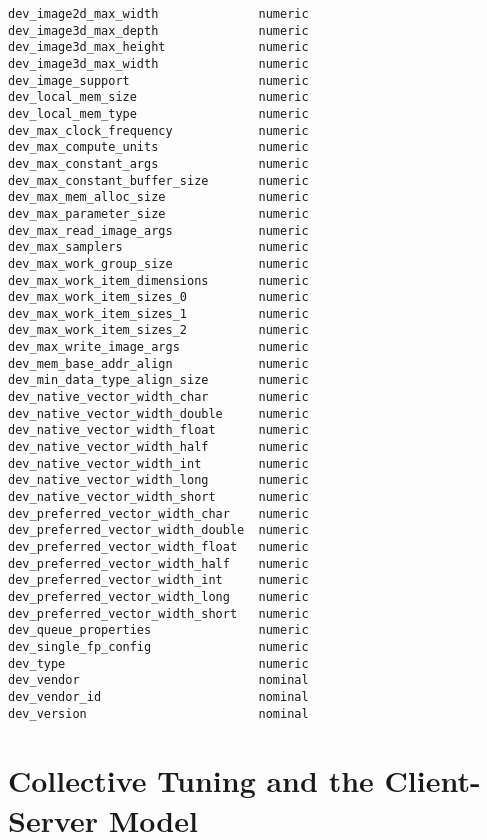 \begin{multicols}{2}
\begin{Verbatim}[fontsize=\footnotesize]
dev_image2d_max_width              numeric
dev_image3d_max_depth              numeric
dev_image3d_max_height             numeric
dev_image3d_max_width              numeric
dev_image_support                  numeric
dev_local_mem_size                 numeric
dev_local_mem_type                 numeric
dev_max_clock_frequency            numeric
dev_max_compute_units              numeric
dev_max_constant_args              numeric
dev_max_constant_buffer_size       numeric
dev_max_mem_alloc_size             numeric
dev_max_parameter_size             numeric
dev_max_read_image_args            numeric
dev_max_samplers                   numeric
dev_max_work_group_size            numeric
dev_max_work_item_dimensions       numeric
dev_max_work_item_sizes_0          numeric
dev_max_work_item_sizes_1          numeric
dev_max_work_item_sizes_2          numeric
dev_max_write_image_args           numeric
dev_mem_base_addr_align            numeric
dev_min_data_type_align_size       numeric
dev_native_vector_width_char       numeric
dev_native_vector_width_double     numeric
dev_native_vector_width_float      numeric
dev_native_vector_width_half       numeric
dev_native_vector_width_int        numeric
dev_native_vector_width_long       numeric
dev_native_vector_width_short      numeric
dev_preferred_vector_width_char    numeric
dev_preferred_vector_width_double  numeric
dev_preferred_vector_width_float   numeric
dev_preferred_vector_width_half    numeric
dev_preferred_vector_width_int     numeric
dev_preferred_vector_width_long    numeric
dev_preferred_vector_width_short   numeric
dev_queue_properties               numeric
dev_single_fp_config               numeric
dev_type                           numeric
dev_vendor                         nominal
dev_vendor_id                      nominal
dev_version                        nominal
\end{Verbatim}
\end{multicols}


\section{Collective Tuning and the Client-Server Model}


